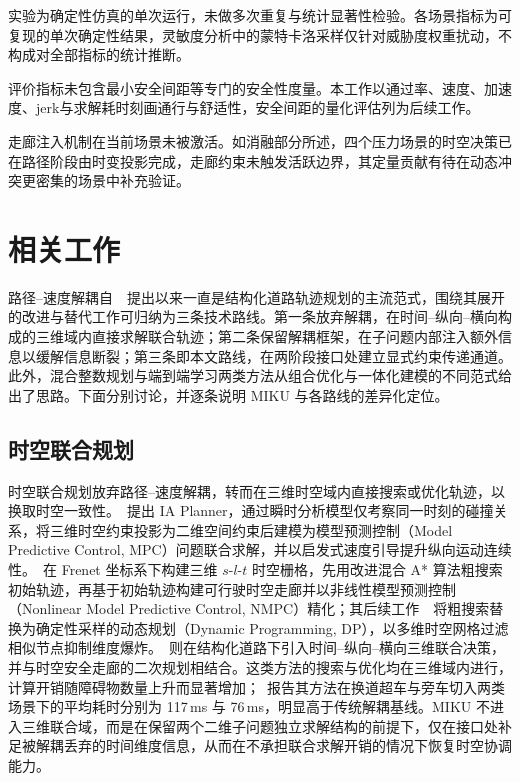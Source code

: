 \documentclass[a4paper,11pt]{ctexart}
\theoremstyle{definition}
\begin{document}
实验为确定性仿真的单次运行，未做多次重复与统计显著性检验。各场景指标为可复现的单次确定性结果，灵敏度分析中的蒙特卡洛采样仅针对威胁度权重扰动，不构成对全部指标的统计推断。

评价指标未包含最小安全间距等专门的安全性度量。本工作以通过率、速度、加速度、jerk与求解耗时刻画通行与舒适性，安全间距的量化评估列为后续工作。

走廊注入机制在当前场景未被激活。如消融部分所述，四个压力场景的时空决策已在路径阶段由时变投影完成，走廊约束未触发活跃边界，其定量贡献有待在动态冲突更密集的场景中补充验证。

\section{相关工作}
\label{sec:related}

路径--速度解耦自~\citet{kant1986pvd}~提出以来一直是结构化道路轨迹规划的主流范式，围绕其展开的改进与替代工作可归纳为三条技术路线。第一条放弃解耦，在时间--纵向--横向构成的三维域内直接求解联合轨迹；第二条保留解耦框架，在子问题内部注入额外信息以缓解信息断裂；第三条即本文路线，在两阶段接口处建立显式约束传递通道。此外，混合整数规划与端到端学习两类方法从组合优化与一体化建模的不同范式给出了思路。下面分别讨论，并逐条说明 MIKU 与各路线的差异化定位。

\subsection{时空联合规划}
\label{sec:related-joint}

时空联合规划放弃路径--速度解耦，转而在三维时空域内直接搜索或优化轨迹，以换取时空一致性。\citet{yang2021_ia_planner}~提出 IA Planner，通过瞬时分析模型仅考察同一时刻的碰撞关系，将三维时空约束投影为二维空间约束后建模为模型预测控制（Model Predictive Control, MPC）问题联合求解，并以启发式速度引导提升纵向运动连续性。\citet{hu2023_hybrid_astar_slt}~在 Frenet 坐标系下构建三维 $s$-$l$-$t$ 时空栅格，先用改进混合 A* 算法粗搜索初始轨迹，再基于初始轨迹构建可行驶时空走廊并以非线性模型预测控制（Nonlinear Model Predictive Control, NMPC）精化；其后续工作~\citep{hu2025_dp_nmpc}~将粗搜索替换为确定性采样的动态规划（Dynamic Programming, DP），以多维时空网格过滤相似节点抑制维度爆炸。\citet{qiao2025stjoint}~则在结构化道路下引入时间--纵向--横向三维联合决策，并与时空安全走廊的二次规划相结合。这类方法的搜索与优化均在三维域内进行，计算开销随障碍物数量上升而显著增加；\citet{hu2023_hybrid_astar_slt}~报告其方法在换道超车与旁车切入两类场景下的平均耗时分别为 117\,ms 与 76\,ms，明显高于传统解耦基线。MIKU 不进入三维联合域，而是在保留两个二维子问题独立求解结构的前提下，仅在接口处补足被解耦丢弃的时间维度信息，从而在不承担联合求解开销的情况下恢复时空协调能力。
\end{document}
